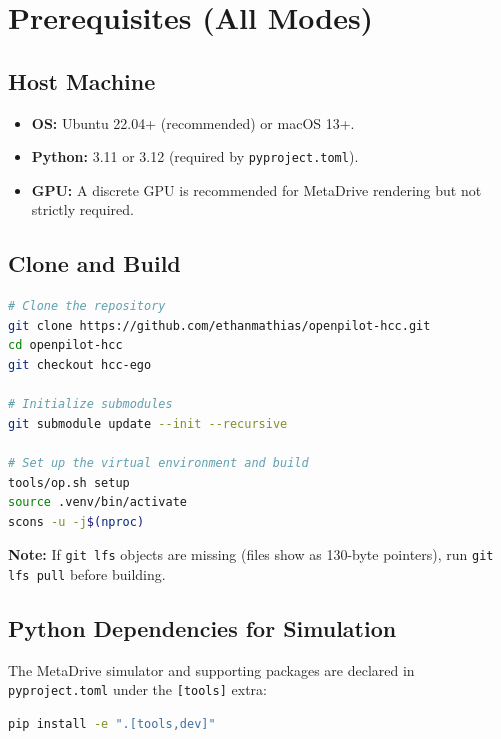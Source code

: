 \documentclass[11pt, letterpaper]{article}
\newcommand{\warn}[1]{%
  \medskip\noindent\colorbox{warnbg}{\parbox{\dimexpr\linewidth-2\fboxsep}{%
    \textbf{Note:} #1}}\medskip}
\begin{document}
\section{Prerequisites (All Modes)}
\label{sec:prereqs}

\subsection{Host Machine}

\begin{itemize}
  \item \textbf{OS:} Ubuntu 22.04+ (recommended) or macOS 13+.
  \item \textbf{Python:} 3.11 or 3.12 (required by \texttt{pyproject.toml}).
  \item \textbf{GPU:} A discrete GPU is recommended for MetaDrive rendering
        but not strictly required.
\end{itemize}

\subsection{Clone and Build}

\begin{lstlisting}[language=bash]
# Clone the repository
git clone https://github.com/ethanmathias/openpilot-hcc.git
cd openpilot-hcc
git checkout hcc-ego

# Initialize submodules
git submodule update --init --recursive

# Set up the virtual environment and build
tools/op.sh setup
source .venv/bin/activate
scons -u -j$(nproc)
\end{lstlisting}

\warn{If \texttt{git lfs} objects are missing (files show as 130-byte
pointers), run \texttt{git lfs pull} before building.}

\subsection{Python Dependencies for Simulation}

The MetaDrive simulator and supporting packages are declared in
\texttt{pyproject.toml} under the \texttt{[tools]} extra:

\begin{lstlisting}[language=bash]
pip install -e ".[tools,dev]"
\end{lstlisting}
\end{document}
